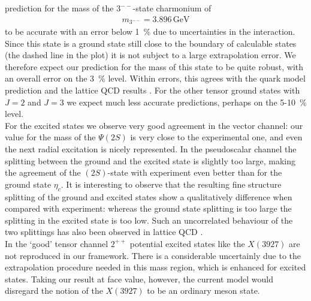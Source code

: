 prediction for the mass of the $3^{--}$-state charmonium of 
%
\begin{align}
%
  m_{3^{--}}= 3.896 \,\mbox{GeV}
%
\end{align}
%
to be accurate with an error below 1~\% due to uncertainties in the interaction.
Since this state is a ground state still close to the boundary of calculable states 
(the dashed line in the plot) it is not subject to a large extrapolation error. We 
therefore expect our prediction for the mass of this state to be quite robust, with 
an overall error on the 3~\% level. Within errors, this agrees with the quark model 
prediction \cite{Ebert:2011jc} and the lattice QCD results \cite{Bali:2011rd,Liu:2012ze}.
For the other tensor ground states with $J=2$ and $J=3$ we expect much less accurate 
predictions, perhaps on the 5-10~\% level. \\ 

For the excited states we observe very good agreement in the vector channel: our
value for the mass of the $\Psi(2S)$ is very close to the experimental one, and even
the next radial excitation is nicely represented. In the pseudoscalar channel the 
splitting between the ground and the excited state is slightly too large, making the 
agreement of the $(2S)$-state with experiment even better than for the ground state
$\eta_c$. It is interesting to observe that the resulting fine structure splitting of 
the ground and excited states show a qualitatively difference when compared with 
experiment: whereas the ground state splitting is too large the splitting in the 
excited state is too low. Such an uncorrelated behaviour of the two splittings has
also been observed in lattice QCD \cite{Bali:2011rd}. \\

In the `good' tensor channel $2^{++}$ potential excited states like
the $X(3927)$ are not reproduced in our framework. There is a considerable uncertainly 
due to the extrapolation procedure needed in this mass region, which is enhanced for
excited states. Taking our result at face value, however, the current model would disregard 
the notion of the $X(3927)$ to be an ordinary meson state. \\

